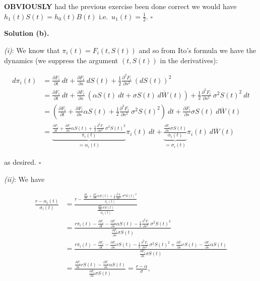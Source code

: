 \documentclass[
]{book}
\begin{document}
\textbf{OBVIOUSLY} had the previous exercise been done correct we would have \(h_1(t)S(t)=h_0(t)B(t)\) i.e.~\(u_1(t)=\frac{1}{2}\). \(\square\)

\noindent\makebox[\linewidth]{\rule{\textwidth}{0.4pt}}

\textbf{Solution (b).}

\emph{(i)}: We know that \(\pi_i(t)=F_i(t,S(t))\) and so from Ito's formula we have the dynamics (we suppress the argument \((t,S(t))\) in the derivatives):

\begin{align*}
d\pi_i(t)&=\frac{\partial F_i}{\partial t}\ dt+\frac{\partial F_i}{\partial s}\ dS(t)+\frac{1}{2}\frac{\partial^2 F_i}{\partial s^2}\ (dS(t))^2\\
&=\frac{\partial F_i}{\partial t}\ dt+\frac{\partial F_i}{\partial s}\ (\alpha S(t)\ dt+\sigma S(t)\ d\overline{W}(t))+\frac{1}{2}\frac{\partial^2 F_i}{\partial s^2}\ \sigma^2 S(t)^2\ dt\\
&=\left(\frac{\partial F_i}{\partial t}+\frac{\partial F_i}{\partial s}\alpha S(t)+\frac{1}{2}\frac{\partial^2 F_i}{\partial s^2}\ \sigma^2 S(t)^2\right)\ dt+\frac{\partial F_i}{\partial s}\sigma S(t)\ d\overline{W}(t)\\
&=\underbrace{\frac{\frac{\partial F_i}{\partial t}+\frac{\partial F_i}{\partial s}\alpha S(t)+\frac{1}{2}\frac{\partial^2 F_i}{\partial s^2}\ \sigma^2 S(t)^2}{\pi_i(t)}}_{=\alpha_i(t)}\pi_i(t)\ dt+\underbrace{\frac{\frac{\partial F_i}{\partial s}\sigma S(t)}{\alpha_i(t)}}_{=\sigma_i(t)}\pi_i(t)\ d\overline{W}(t)
\end{align*}

as desired. \(\square\)

\emph{(ii)}: We have

\begin{align*}
\frac{r-\alpha_i(t)}{\sigma_i(t)}&=\frac{r-\frac{\frac{\partial F_i}{\partial t}+\frac{\partial F_i}{\partial s}\alpha S(t)+\frac{1}{2}\frac{\partial^2 F_i}{\partial s^2}\ \sigma^2 S(t)^2}{\pi_i(t)}}{\frac{\frac{\partial F_i}{\partial s}\sigma S(t)}{\alpha_i(t)}}\\
&=\frac{r\pi_i(t)-\frac{\partial F_i}{\partial t}-\frac{\partial F_i}{\partial s}\alpha S(t)-\frac{1}{2}\frac{\partial^2 F_i}{\partial s^2}\ \sigma^2 S(t)^2}{\frac{\partial F_i}{\partial s}\sigma S(t)}\\
&=\frac{r\pi_i(t)-\frac{\partial F_i}{\partial t}-\frac{\partial F_i}{\partial s}r S(t)-\frac{1}{2}\frac{\partial^2 F_i}{\partial s^2}\ \sigma^2 S(t)^2+\frac{\partial F_i}{\partial s}r S(t)-\frac{\partial F_i}{\partial s}\alpha S(t)}{\frac{\partial F_i}{\partial s}\sigma S(t)}\\
&=\frac{\frac{\partial F_i}{\partial s}r S(t)-\frac{\partial F_i}{\partial s}\alpha S(t)}{\frac{\partial F_i}{\partial s}\sigma S(t)}=\frac{r -\alpha }{\sigma },
\end{align*}
\end{document}
